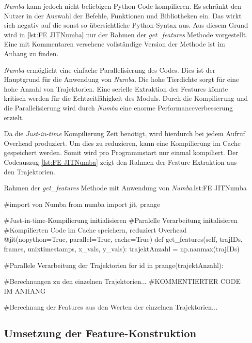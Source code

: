 \textit{Numba} kann jedoch nicht beliebigen Python-Code kompilieren. Es schränkt den Nutzer in der Auswahl der Befehle, Funktionen und Bibliotheken ein. Das wirkt sich negativ auf die sonst so übersichtliche Python-Syntax aus. Aus diesem Grund wird in \ref{lst:FE JITNumba} nur der Rahmen der \textit{get\_features} Methode vorgestellt. Eine mit Kommentaren versehene vollständige Version der Methode ist im Anhang zu finden. \par

\textit{Numba} ermöglicht eine einfache Parallelisierung des Codes. Dies ist der Hauptgrund für die Anwendung von \textit{Numba}. Die hohe Tierdichte sorgt für eine hohe Anzahl von Trajektorien. Eine serielle Extraktion der Features könnte kritisch werden für die Echtzeitfähigkeit des Moduls. Durch die Kompilierung und die Parallelisierung wird durch \textit{Numba} eine enorme Performanceverbesserung erzielt.\par

Da die \textit{Just-in-time} Kompilierung Zeit benötigt, wird hierdurch bei jedem Aufruf \gls{Overhead} produziert. Um dies zu reduzieren, kann eine Kompilierung im Cache gespeichert werden. Somit wird pro Programmstart nur einmal kompiliert. Der Codeauszug \ref{lst:FE JITNumba} zeigt den Rahmen der Feature-Extraktion aus den Trajektorien.

\begin{pythoncode}{Rahmen der \textit{get\_features} Methode mit Anwendung von \textit{Numba}.}{lst:FE JITNumba}

#import von Numba
from numba import jit, prange

#Just-in-time-Kompilierung initialisieren
#Paralelle Verarbeitung initalisieren 
#Kompilierten Code im Cache speichern, reduziert Overhead
@jit(nopython=True, parallel=True, cache=True)
def get_features(self, trajIDs, frames, unixtimestamps, x_vals, y_vals):
    trajektAnzahl = np.nanmax(trajIDs)

    #Parallele Verarbeitung der Trajektorien 
    for id in prange(trajektAnzahl):

        #Berechnungen zu den einzelnen Trajektorien...
        #KOMMENTIERTER CODE IM ANHANG

    #Berechnung der Features aus den Werten der einzelnen Trajektorien...

\end{pythoncode}


\subsection{Umsetzung der Feature-Konstruktion}

